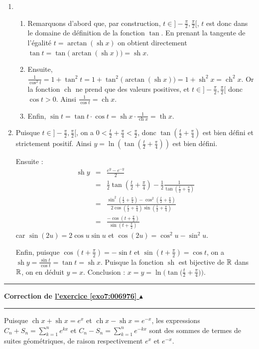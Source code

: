 \documentclass[11pt,a4paper]{article}
\newcommand{\ch}{\mathop{\mathrm{ch}}\nolimits}
\newcommand{\sh}{\mathop{\mathrm{sh}}\nolimits}
\renewcommand{\tanh}{\mathop{\mathrm{th}}\nolimits}
\newcommand{\Arctan}{\mathop{\mathrm{arctan}}\nolimits}
\newcounter{exo}
\newcommand{\correction}[1]{\hypertarget{cor7:#1}{}\label{cor7:#1}{\bf Correction de \hyperlink{exo7:#1}{l'exercice \ref{exo7:#1} $\blacktriangle$}}\vspace{1mm}\hrule\vspace{1mm}}
\newcommand{\fincorrection}{\vspace{1mm}\hrule\vspace*{7mm}}
\begin{document}
\begin{enumerate}
  \item 
  \begin{enumerate}
    \item Remarquons d'abord que, par construction, $t\in]-\frac{\pi}{2},\frac{\pi}{2}[$,
    $t$ est donc dans le domaine de définition de la fonction $\tan$.
    En prenant la tangente de l'égalité $t=\Arctan(\sh x)$ on obtient directement $\tan t=
    \tan\big(\Arctan(\sh x)\big) =\sh x$. 

    \item Ensuite, $\frac{1}{\cos^2t}=1+\tan^2 t= 1 + \tan^2\big(\Arctan(\sh x)\big) 
    = 1+\sh^2x=\ch^2x$. Or la fonction $\ch$ ne prend que des valeurs positives, 
    et $t\in]-\frac{\pi}{2},\frac{\pi}{2}[$ donc $\cos t>0$. Ainsi $\frac{1}{\cos t}=\ch x$. 

    \item Enfin, $\sin t=\tan t \cdot \cos t= \sh x \cdot \frac{1}{\ch x}=\tanh x$.
  \end{enumerate}

\item Puisque $t\in]-\frac{\pi}{2},\frac{\pi}{2}[$, on a 
$0<\frac{t}{2}+\frac{\pi}{4}<\frac{\pi}{2}$, donc 
$\tan\left(\frac{t}{2}+\frac{\pi}{4}\right)$ est bien défini et 
strictement positif. Ainsi $y=\ln \left(\tan\left(\frac{t}{2}+\frac{\pi}{4}\right)\right)$ 
est bien défini.

Ensuite : 
\begin{eqnarray*}
\sh y
  &=& \frac{e^y-e^{-y}}{2}\\
  &=& \tfrac{1}{2}\tan\left(\tfrac{t}{2}+\tfrac{\pi}{4}\right)-
  \tfrac{1}{2}\frac{1}{\tan\left(\frac{t}{2}+\frac{\pi}{4}\right)}\\
  &=&\frac{\sin^2\left(\frac{t}{2}+\frac{\pi}{4}\right)-
 \cos^2\left(\frac{t}{2}+\frac{\pi}{4}\right)}{2\cos\left(\frac{t}{2}+\frac{\pi}{4}\right)\sin\left(\frac{t}{2}+\frac{\pi}{4}\right)}\\
 &=&\frac{-\cos\left(t+\frac{\pi}{2}\right)}{\sin\left(t+\frac{\pi}{2}\right)}
\end{eqnarray*}
car $\sin(2u)=2\cos u\sin u$ et $\cos(2u)=\cos^2u-\sin^2u$. 


Enfin, puisque $\cos\left(t+\frac{\pi}{2}\right)=-\sin t$ et 
$\sin\left(t+\frac{\pi}{2}\right)=\cos t$, on a $\sh y= \frac{\sin t}{\cos t} = \tan t=\sh x$. 
Puisque la fonction $\sh$ est bijective de $\mathbb{R}$ dans $\mathbb{R}$, on en déduit $y=x$.
Conclusion : $x = y = \ln \big(\tan\big(\frac{t}{2}+\frac{\pi}{4}\big)\big)$.
\end{enumerate}
\fincorrection
\correction{006976}
Puisque $\ch x+\sh x=e^x$ et $\ch x-\sh x=e^{-x}$, 
les expressions $C_n+S_n=\sum_{k=1}^ne^{kx}$ et $C_n-S_n=\sum_{k=1}^ne^{-kx}$ 
sont des sommes de termes de suites géométriques, de raison respectivement $e^x$ et $e^{-x}$.
\end{document}
